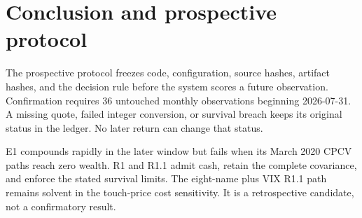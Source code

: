 \FloatBarrier
\section{Conclusion and prospective protocol}

The prospective protocol freezes code, configuration, source hashes, artifact hashes,
and the decision rule before the system scores a future observation. Confirmation requires 36
untouched monthly observations beginning 2026-07-31. A missing quote, failed integer
conversion, or survival breach keeps its original status in the ledger. No later return
can change that status.

E1 compounds rapidly in the later window but fails when its March 2020 CPCV paths reach
zero wealth. R1 and R1.1 admit cash, retain the complete covariance, and enforce the
stated survival limits. The eight-name plus VIX R1.1 path remains solvent in the
touch-price cost sensitivity. It is a retrospective candidate, not a confirmatory result.

\FloatBarrier
